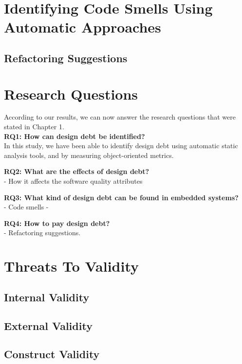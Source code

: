 \section{Identifying Code Smells Using Automatic Approaches}



\subsection{Refactoring Suggestions}



\section{Research Questions}
According to our results, we can now answer the research questions that were stated in Chapter 1.
\\
\textbf{RQ1: How can design debt be identified?} \\
In this study, we have been able to identify design debt using automatic static analysis tools, and by measuring object-oriented metrics.


\textbf{RQ2: What are the effects of design debt?} \\
- How it affects the software quality attributes

\textbf{RQ3: What kind of design debt can be found in embedded systems?} \\
- Code smells
- 

\textbf{RQ4: How to pay design debt?} \\
- Refactoring suggestions.






\section{Threats To Validity}
\label{sub:threats_to_validity}

\subsection{Internal Validity}
\label{sub:internal_validty}

\subsection{External Validity}
\label{sub:external_validity}

\subsection{Construct Validity} %
\label{sub:construct_validity}








